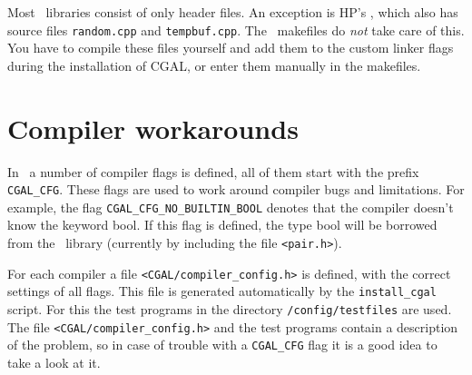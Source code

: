 Most \stl\ libraries consist of only header files. An exception is
HP's \stl, which also has source files \verb~random.cpp~ and
\verb~tempbuf.cpp~.  The \cgal\ makefiles do {\em not} take care of
this. You have to compile these files yourself and add them to the
custom linker flags during the installation of CGAL, or enter them
manually in the makefiles.



\section{Compiler workarounds}
In \cgal\ a number of compiler flags is defined, all of them start
with the prefix \texttt{CGAL\_CFG}. These flags are used to work
around compiler bugs and limitations.  For example, the flag
\texttt{CGAL\_CFG\_NO\_BUILTIN\_BOOL} denotes that the compiler
doesn't know the keyword bool. If this flag is defined, the type bool
will be borrowed from the \stl\ library (currently by including the
file \texttt{<pair.h>}).

For each compiler a file \texttt{<CGAL/compiler\_config.h>} is defined, with the
correct settings of all flags. This file is generated automatically by the
\texttt{install\_cgal} script. For this the test programs in the directory
\texttt{\cgaldir/config/testfiles} are used. The file \texttt{<CGAL/compiler\_config.h>}
and the test programs contain a description of the problem, so in case of trouble
with a \texttt{CGAL\_CFG} flag it is a good idea to take a look at it.

